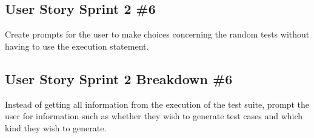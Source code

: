\subsection{User Story Sprint 2 \#6}
Create prompts for the user to make choices concerning the random tests without having to use the execution statement.

\subsection{User Story Sprint 2 Breakdown \#6}
Instead of getting all information from the execution of the test suite, prompt the user for information such as  whether they wish to generate test cases and which kind they wish to generate. 






